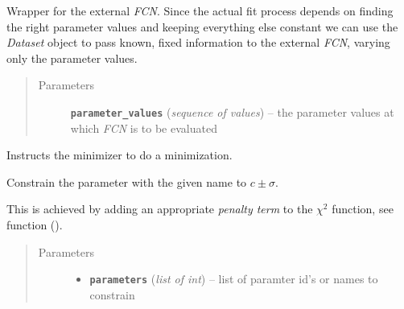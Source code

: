 \documentclass[a4paper,10pt,english]{sphinxmanual}
\begin{document}
\begin{fulllineitems}
\begin{fulllineitems}
\label{module_doc:kafe.fit.Fit.call_external_fcn}
Wrapper for the external \emph{FCN}. Since the actual fit process depends on
finding the right parameter values and keeping everything else constant
we can use the \emph{Dataset} object to pass known, fixed information to the
external \emph{FCN}, varying only the parameter values.
\begin{quote}\begin{description}
\item[{Parameters}] \leavevmode
\textbf{\texttt{parameter\_values}} (\emph{sequence of values}) -- the parameter values at which \emph{FCN} is to be evaluated

\end{description}\end{quote}

\end{fulllineitems}


\begin{fulllineitems}
\label{module_doc:kafe.fit.Fit.call_minimizer}
Instructs the minimizer to do a minimization.

\end{fulllineitems}


\begin{fulllineitems}
\label{module_doc:kafe.fit.Fit.constrain_parameters}
Constrain the parameter with the given name to \(c\pm\sigma\).

This is achieved by adding an appropriate \emph{penalty term} to the
\(\chi^2\) function, see function {\hyperref[module_doc:kafe.fit.chi2]{\emph{}}} ().
\begin{quote}\begin{description}
\item[{Parameters}] \leavevmode\begin{itemize}
\item {} 
\textbf{\texttt{parameters}} (\emph{list of int}) -- list of paramter id's or names to constrain


\end{itemize}
\end{description}
\end{quote}
\end{fulllineitems}
\end{fulllineitems}
\end{document}
